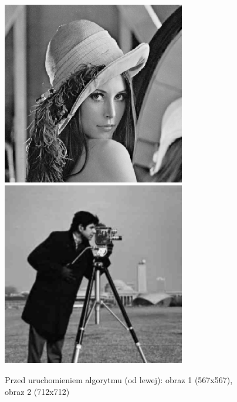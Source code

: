 \documentclass[a4paper,12pt]{book}
\begin{document}
\begin{figure}[H]
	\caption{Przed uruchomieniem algorytmu (od lewej): obraz 1 (567x567), obraz 2 (712x712)}
	\includegraphics[width=8cm, height=8cm]{lena-unmodified.png}
	\includegraphics[width=8cm, height=8cm]{man-unmodified.jpg}
\end{figure}
\end{document}
